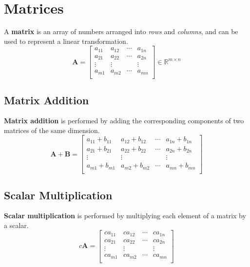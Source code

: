 \documentclass{article}
\begin{document}
\section{Matrices}
\begin{definition}
    A \textbf{matrix} is an array of numbers arranged into \textit{rows}
    and \textit{columns}, and can be used to represent a linear
    transformation.
    \begin{equation*}
        \symbf{A} =
        \begin{bmatrix}
            a_{11} & a_{12} & \cdots & a_{1n} \\
            a_{21} & a_{22} & \cdots & a_{2n} \\
            \vdots & \vdots &        & \vdots \\
            a_{m1} & a_{m2} & \cdots & a_{mn} \\
        \end{bmatrix}
        \in \mathbb{R}^{m \times n}
    \end{equation*}
\end{definition}
\subsection{Matrix Addition}
\begin{definition}
    \textbf{Matrix addition} is performed by adding the corresponding
    components of two matrices of the same dimension.
    \begin{equation*}
        \symbf{A} + \symbf{B} =
        \begin{bmatrix}
            a_{11} + b_{11} & a_{12} + b_{12} & \cdots & a_{1n} + b_{1n} \\
            a_{21} + b_{21} & a_{22} + b_{22} & \cdots & a_{2n} + b_{2n} \\
            \vdots          & \vdots          &        & \vdots          \\
            a_{m1} + b_{m1} & a_{m2} + b_{m2} & \cdots & a_{mn} + b_{mn} \\
        \end{bmatrix}
    \end{equation*}
\end{definition}
\subsection{Scalar Multiplication}
\begin{definition}
    \textbf{Scalar multiplication} is performed by multiplying each
    element of a matrix by a scalar.
    \begin{equation*}
        c\symbf{A} =
        \begin{bmatrix}
            ca_{11} & ca_{12} & \cdots & ca_{1n} \\
            ca_{21} & ca_{22} & \cdots & ca_{2n} \\
            \vdots  & \vdots  &        & \vdots  \\
            ca_{m1} & ca_{m2} & \cdots & ca_{mn} \\
        \end{bmatrix}
    \end{equation*}
\end{definition}
\end{document}
